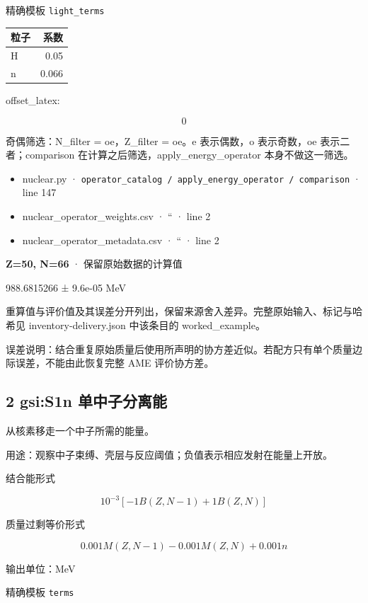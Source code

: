\documentclass[
  11pt,
  letterpaper,
]{article}
\providecommand{\tightlist}{%
  \setlength{\itemsep}{0pt}\setlength{\parskip}{0pt}}
\begin{document}
精确模板 \texttt{light\_terms}

\begin{longtable}[]{@{}lr@{}}
\toprule\noalign{}
粒子 & 系数 \\
\midrule\noalign{}
\endhead
\bottomrule\noalign{}
\endlastfoot
H & 0.05 \\
n & 0.066 \\
\end{longtable}

offset\_latex:

\[
0
\]

奇偶筛选：N\_filter = oe，Z\_filter = oe。e 表示偶数，o 表示奇数，oe
表示二者；comparison 在计算之后筛选，apply\_energy\_operator
本身不做这一筛选。

\begin{itemize}
\tightlist
\item
  nuclear.py ·
  \texttt{operator\_catalog\ /\ apply\_energy\_operator\ /\ comparison}
  · line 147
\item
  nuclear\_operator\_weights.csv · `` · line 2
\item
  nuclear\_operator\_metadata.csv · `` · line 2
\end{itemize}

\textbf{Z=50, N=66} · 保留原始数据的计算值

988.6815266 ± 9.6e-05 MeV

重算值与评价值及其误差分开列出，保留来源舍入差异。完整原始输入、标记与哈希见
inventory-delivery.json 中该条目的 worked\_example。

误差说明：结合重复原始质量后使用所声明的协方差近似。若配方只有单个质量边际误差，不能由此恢复完整
AME 评价协方差。

\subsection{2 gsi:S1n
单中子分离能}\label{gsis1n-ux5355ux4e2dux5b50ux5206ux79bbux80fd}

从核素移走一个中子所需的能量。

用途：观察中子束缚、壳层与反应阈值；负值表示相应发射在能量上开放。

结合能形式

\[
10^{-3}[-1B(Z,N-1)+1B(Z,N)]
\]

质量过剩等价形式

\[
0.001M(Z,N-1)-0.001M(Z,N) + 0.001 n
\]

输出单位：MeV

精确模板 \texttt{terms}
\end{document}
